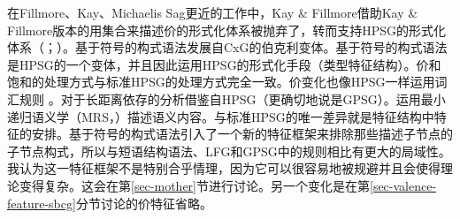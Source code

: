 在Fillmore、Kay、Michaelis \biband Sag更近的工作中，Kay \& Fillmore借助Kay \& Fillmore版本的用集合来描述价的形式化体系被抛弃了，转而支持HPSG的形式化体系（\citealp{Kay2005a,Michaelis2006a,Sag2012a}；\citealp*[--11]{SBK2012a}）。基于符号的构式语法发展自CxG的伯克利变体。基于符号的构式语法是HPSG的一个变体\citep[]{Sag2010b}，并且因此运用HPSG的形式化手段（类型特征结构）。价和饱和的处理方式与标准HPSG的处理方式完全一致。价变化也像HPSG一样运用词汇规则 \citep*[\S~2.3]{SBK2012a}。对于长距离依存的分析借鉴自HPSG（更确切地说是GPSG\indexgpsgc）。运用最小递归语义学（MRS\indexmrsc，\citealp*{CFPS2005a}）描述语义内容。与标准HPSG的唯一差异就是特征结构中特征的安排。基于符号的构式语法引入了一个新的特征框架来排除那些描述子节点的子节点构式，所以与短语结构语法、LFG和GPSG中的规则相比有更大的局域性。我认为这一特征框架不是特别合乎情理，因为它可以很容易地被规避并且会使得理论变得复杂。这会在第\ref{sec-mother}节进行讨论。另一个变化是在第\ref{sec-valence-feature-sbcg}分节讨论的价特征省略。

